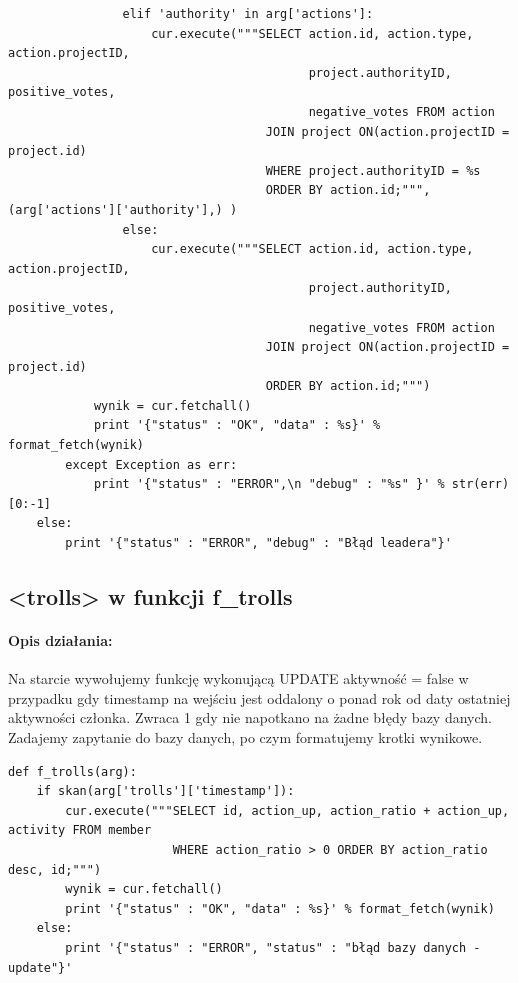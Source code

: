 \documentclass{article}
\begin{document}
\begin{verbatim}
                elif 'authority' in arg['actions']:
                    cur.execute("""SELECT action.id, action.type, action.projectID,
                                          project.authorityID, positive_votes,
                                          negative_votes FROM action
                                    JOIN project ON(action.projectID = project.id)
                                    WHERE project.authorityID = %s
                                    ORDER BY action.id;""", (arg['actions']['authority'],) )
                else:
                    cur.execute("""SELECT action.id, action.type, action.projectID,
                                          project.authorityID, positive_votes,
                                          negative_votes FROM action
                                    JOIN project ON(action.projectID = project.id)
                                    ORDER BY action.id;""")
            wynik = cur.fetchall()
            print '{"status" : "OK", "data" : %s}' % format_fetch(wynik) 
        except Exception as err:
            print '{"status" : "ERROR",\n "debug" : "%s" }' % str(err)[0:-1]
    else:
        print '{"status" : "ERROR", "debug" : "Błąd leadera"}'   
\end{verbatim}









\newpage
\subsection{<trolls> w funkcji f\_trolls }
\paragraph{Opis działania: }
Na starcie wywołujemy funkcję wykonującą UPDATE aktywność = false w\,przypadku gdy timestamp na wejściu jest oddalony o ponad rok od daty ostatniej aktywności członka. Zwraca 1 gdy nie napotkano na żadne błędy bazy danych. Zadajemy zapytanie do bazy danych, po czym formatujemy krotki wynikowe.
\begin{verbatim}
def f_trolls(arg):
    if skan(arg['trolls']['timestamp']):                                                  
        cur.execute("""SELECT id, action_up, action_ratio + action_up, activity FROM member
                       WHERE action_ratio > 0 ORDER BY action_ratio desc, id;""")
        wynik = cur.fetchall()
        print '{"status" : "OK", "data" : %s}' % format_fetch(wynik)     
    else:
        print '{"status" : "ERROR", "status" : "błąd bazy danych - update"}' 
\end{verbatim}
\end{document}
